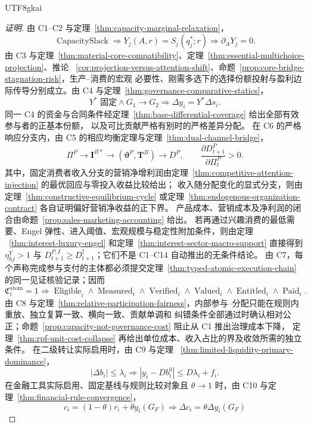 \documentclass[12pt,a4paper,openany]{report}
\newcommand{\Abs}[1]{\left\lvert #1\right\rvert}
\DeclareMathOperator{\CapacitySlack}{CapacitySlack}
\DeclareMathOperator{\Eligible}{Eligible}
\DeclareMathOperator{\Measured}{Measured}
\DeclareMathOperator{\Verified}{Verified}
\DeclareMathOperator{\Valued}{Valued}
\DeclareMathOperator{\Entitled}{Entitled}
\DeclareMathOperator{\Paid}{Paid}
\begin{document}
\begin{CJK*}{UTF8}{gkai}
\begin{proof}[证明]
由 C1--C2 与定理~\ref{thm:capacity-marginal-relaxation}，
\[
  \CapacitySlack
  \Longrightarrow
  Y_j(A,r)=S_j(q_j^*;r)
  \Longrightarrow
  \partial_A Y_j=0.
\]
由 C3 与定理~\ref{thm:material-core-compatibility}、定理~\ref{thm:essential-multichoice-projection}、推论
~\ref{cor:projection-versus-attention-shift}、命题~\ref{prop:core-bridge-stagnation-risk}，生产--消费的宏观
必要性、刚需多选下的选择份额投射与盈利边际传导分别成立。由 C4 与定理~\ref{thm:governance-comparative-statics}，
\[
  Y^*\text{ 固定}
  \wedge G_1\to G_2
  \Longrightarrow
  \Delta y_i=Y^*\Delta s_i.
\]
同一 C4 的资金与合同条件经定理~\ref{thm:base-differential-coverage} 给出全部有效参与者的正基本份额，
以及可比贡献严格有别时的严格差异分配。
在 C6 的严格响应分支内，由 C5 的相应均衡定理与定理~\ref{thm:dual-channel-bridge}，
\[
  \Pi^P\to\mathbf I^{B*}\to
  (\boldsymbol\vartheta^P,\mathbf T^B)
  \to D^P,
  \qquad
  \frac{\partial D_{t+1}^P}{\partial\Pi_t^P}>0.
\]
其中，固定消费者收入分支的营销净增利润由定理~\ref{thm:competitive-attention-injection} 的最优回应与零投入收益比较给出；
收入随分配变化的显式分支，则由定理~\ref{thm:constructive-equilibrium-cycle} 或定理~\ref{thm:endogenous-organization-contract} 各自证明偏好营销净收益的正下界。
产品成本、营销成本及净利润的闭合由命题~\ref{prop:sales-marketing-accounting} 给出。
若再通过兴趣消费的最低需要、Engel 弹性、进入阈值、宏观规模与稳定性附加条件，则由定理
~\ref{thm:interest-luxury-engel} 和定理~\ref{thm:interest-sector-macro-support} 直接得到
\(\eta_{hj}^{Y}>1\) 与 \(D_{t+1}^{P,I}\ge D_{t+1}^{\dagger}\)；它们不是 C1--C14 自动推出的无条件结论。
由 C7，每个声称完成参与支付的主体都必须提交定理~\ref{thm:typed-atomic-execution-chain} 的同一见证核验记录；因而
\[
  \mathfrak C_i^{\mathrm{atom}}=1
  \Longrightarrow
  \Eligible_i\wedge\Measured_i\wedge\Verified_i
  \wedge\Valued_i\wedge\Entitled_i\wedge\Paid_i.
\]
由 C8 与定理~\ref{thm:relative-participation-fairness}，内部参与--分配只能在规则内重放、独立复算一致、横向一致、贡献单调和
纠错条件全部通过时确认相对公正；命题~\ref{prop:capacity-not-governance-cost} 阻止从 C1 推出治理成本下降，
定理~\ref{thm:rpf-unit-cost-collapse} 再给出单位成本、收入占比的界及收敛所需的独立条件。
在二级转让实际启用时，由 C9 与定理
~\ref{thm:limited-liquidity-primary-dominance}，
\[
  \Abs{\Delta b_i}\le\lambda_i
  \Longrightarrow
  \Abs{y_i-Db_i^0}\le D\lambda_i+f_i.
\]
在金融工具实际启用、固定基线与规则比较对象且 \(\theta\to1\) 时，由 C10 与定理~\ref{thm:financial-rule-convergence}，
\[
  c_i=(1-\theta)r_i+\theta y_i(G_F)
  \Longrightarrow
  \Delta c_i=\theta\Delta y_i(G_F)
\]
\end{proof}
\end{CJK*}
\end{document}
